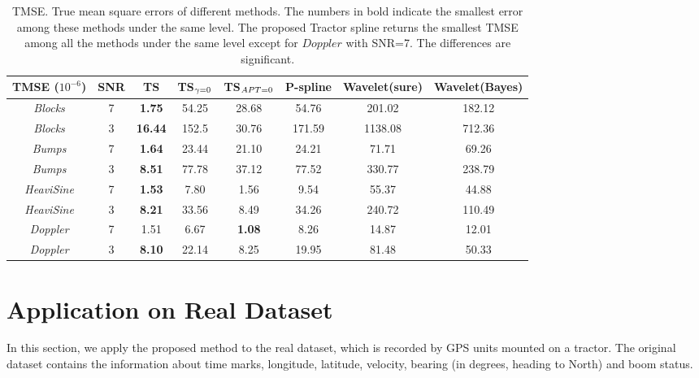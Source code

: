 \begin{table}
	\centering
	\caption{TMSE. True mean square errors of different methods. The numbers in bold indicate the smallest error among these methods under the same level. The proposed Tractor spline returns the smallest TMSE among all the methods under the same level except for $\textit{Doppler}$ with SNR=7. The differences are significant. }\label{tmse3200}
	\setlength\tabcolsep{1.5pt}
	\begin{tabular}{|c|c| c| c| c|c|c|c|}
\hline	TMSE ($10^{-6}$)  & SNR & TS & TS$_{\footnotesize\gamma=0}$ & TS$_{\footnotesize APT=0}$  & P-spline & Wavelet(sure) & Wavelet(Bayes)\\ \hline
		\textit{Blocks}    & 7   & \textbf{1.75} & 54.25 &  28.68   & 54.76   & 201.02   & 182.12   \\ \hline
		\textit{Blocks}    & 3   & \textbf{16.44} & 152.5 & 30.76  & 171.59   & 1138.08  & 712.36  \\ \hline
		\textit{Bumps}     & 7  & \textbf{1.64} & 23.44  & 21.10     & 24.21 & 71.71 & 69.26 \\ \hline
		\textit{Bumps}     & 3  & \textbf{8.51} & 77.78  &37.12     & 77.52 & 330.77 & 238.79 \\ \hline
		\textit{HeaviSine} & 7 & \textbf{1.53}& 7.80  & 1.56     & 9.54   & 55.37  &44.88  \\ \hline
		\textit{HeaviSine} & 3 & \textbf{8.21}& 33.56  & 8.49 & 34.26 & 240.72& 110.49\\ \hline
		\textit{Doppler}   & 7   & 1.51& 6.67  & \textbf{1.08}   &  8.26   & 14.87  & 12.01  \\ \hline
		\textit{Doppler}   & 3   & \textbf{8.10} & 22.14  & 8.25   & 19.95    &81.48  &50.33   \\ \hline
	\end{tabular}	
\end{table}



\section{Application on Real Dataset}\label{splineapplication}

In this section, we apply the proposed method to the real dataset, which is recorded by GPS units mounted on a tractor. The original dataset contains the information about time marks, longitude, latitude, velocity, bearing (in degrees,  heading to North) and boom status. 

